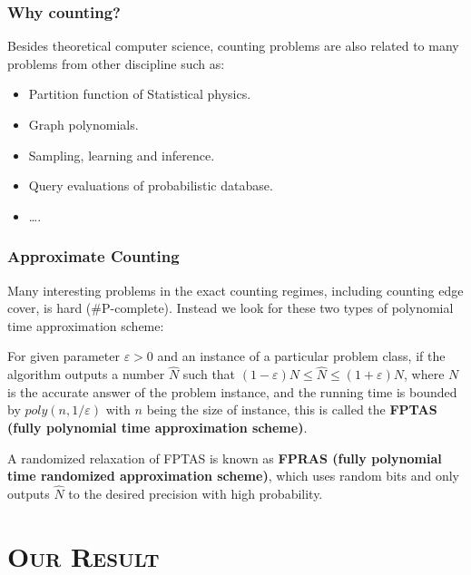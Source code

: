 \documentclass[mathserif]{beamer}
\newcommand{\eps}{\varepsilon}
\begin{document}
\begin{frame}
	\frametitle{Why counting?}
Besides theoretical computer science, counting problems are also related to many problems from other discipline such as:
\begin{itemize}
	\item Partition function of Statistical physics. 
		\pause
	\item Graph polynomials. 
		\pause
	\item Sampling, learning and inference. 
		\pause
	\item Query evaluations of probabilistic database.
	\item \dots.
\end{itemize}
\end{frame}

\begin{frame}
	\frametitle{Approximate Counting}
	Many interesting problems in the exact counting regimes, including counting edge cover, is hard (\#P-complete).
	Instead we look for these two types of polynomial time approximation scheme:
	\pause
	\begin{definition}[FPTAS]
		For given parameter $\eps > 0$ and an instance of a particular problem class, if the algorithm outputs a number $\hat{N}$ such that $(1-\eps) N \leq \hat{N} \leq (1+\eps) N$, where $N$ is the accurate answer of the problem instance, and the running time is bounded by $poly(n, 1/ \eps)$ with $n$ being the size of instance, this is called the {\bf FPTAS (fully polynomial time approximation scheme)}.

	\end{definition}
	\pause
	\begin{definition}[FPRAS]
		A randomized relaxation of FPTAS is known as {\bf FPRAS (fully polynomial time randomized approximation scheme)}, which uses random bits and only outputs $\hat{N}$ to the desired precision with high probability.
	\end{definition}
\end{frame}

%	


\section{\scshape Our Result}
\end{document}
